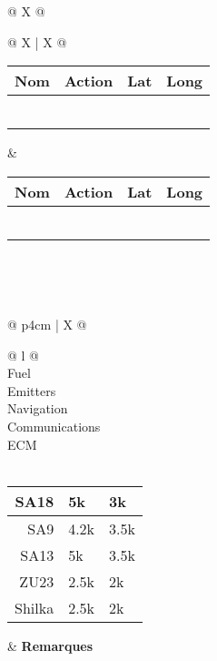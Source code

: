 {\begin{tabularx}{\textwidth}{ @{} X @{} }
	\\[-3ex] \midrule
	{\begin{tabularx}{\textwidth}{@{} X | X @{}}
		{\begin{tabularx}{\linewidth}{@{} *{4}X @{}}
			Nom & Action & Lat & Long\\[-3ex] \midrule
			\hfill & \hfill & \hfill & \hfill\\ \midrule
			\hfill & \hfill & \hfill & \hfill\\ \midrule
			\hfill & \hfill & \hfill & \hfill\\ \midrule
			\hfill & \hfill & \hfill & \hfill\\ \midrule
			\hfill & \hfill & \hfill & \hfill\\ \midrule
			\hfill & \hfill & \hfill & \hfill\\
		\end{tabularx}} &
		{\begin{tabularx}{\linewidth}{@{} *{4}X @{}}
			Nom & Action & Lat & Long\\[-3ex] \midrule
			\hfill & \hfill & \hfill & \hfill\\ \midrule
			\hfill & \hfill & \hfill & \hfill\\ \midrule
			\hfill & \hfill & \hfill & \hfill\\ \midrule
			\hfill & \hfill & \hfill & \hfill\\ \midrule
			\hfill & \hfill & \hfill & \hfill\\ \midrule
			\hfill & \hfill & \hfill & \hfill\\
		\end{tabularx}}\\
	\end{tabularx}}\\ \midrule
	{\begin{tabularx}{\textwidth}{@{} p{4cm} | X @{}}
		\begin{tabular}[t]{@{} l @{}}
			\\[-3ex] \midrule
			Fuel\\[-3ex]
			Emitters\\[-3ex]
			Navigation\\[-3ex]
			Communications\\[-3ex]
			ECM\\[-3ex]
			\midrule
			\\[-3ex] \midrule
			{\begin{tabularx}{\linewidth}{@{} r X X @{}}
				SA18 & 5k & 3k\\[-3ex] \midrule
				SA9 & 4.2k & 3.5k\\[-3ex] \midrule
				SA13 & 5k & 3.5k\\[-3ex] \midrule
				ZU23 & 2.5k & 2k\\[-3ex] \midrule
				Shilka & 2.5k & 2k\\[-3ex] \midrule
			\end{tabularx}}
		\end{tabular} &
		\textbf{Remarques}\\
	\end{tabularx}}\\
\end{tabularx}
}


